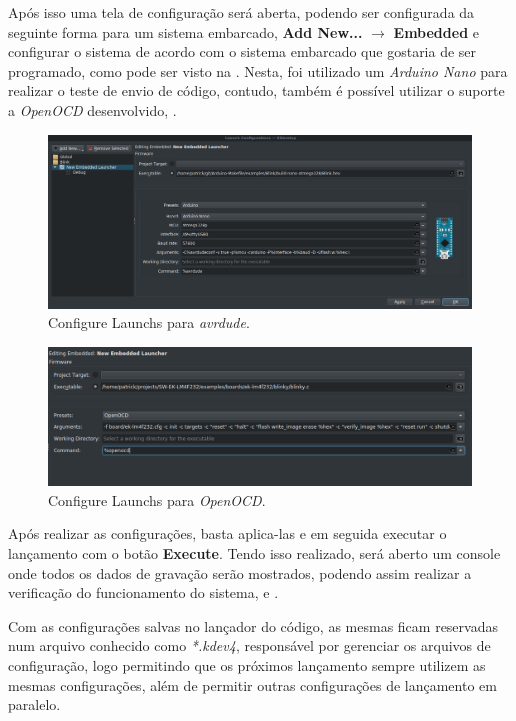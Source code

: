 Após isso uma tela de configuração será aberta, podendo ser configurada da seguinte forma para um sistema embarcado, \textbf{Add New...} $\rightarrow$ \textbf{Embedded} e configurar o sistema de acordo com o sistema embarcado que gostaria de ser programado, como pode ser visto na . Nesta, foi utilizado um \textit{Arduino Nano} para realizar o teste de envio de código, contudo, também é possível utilizar o suporte a \textit{OpenOCD} desenvolvido, .

\begin{figure}[!htb]
  \centering
  \caption[Configure Launchs para \textit{avrdude}]{Configure Launchs para \textit{avrdude}.}
  \label{fig:run2}
  \includegraphics[width=1\textwidth]{figuras/run2.png}
\end{figure}

\begin{figure}[!htb]
  \centering
  \caption[Configure Launchs para \textit{OpenOCD}]{Configure Launchs para \textit{OpenOCD}.}
  \label{fig:openocd}
  \includegraphics[width=1\textwidth]{figuras/openocd.png}
\end{figure}

Após realizar as configurações, basta aplica-las e em seguida executar o lançamento com o botão \textbf{Execute}. Tendo isso realizado, será aberto um console onde todos os dados de gravação serão mostrados, podendo assim realizar a verificação do funcionamento do sistema,  e .

Com as configurações salvas no lançador do código, as mesmas ficam reservadas num arquivo conhecido como \textit{*.kdev4}, responsável por gerenciar os arquivos de configuração, logo permitindo que os próximos lançamento sempre utilizem as mesmas configurações, além de permitir outras configurações de lançamento em paralelo.

